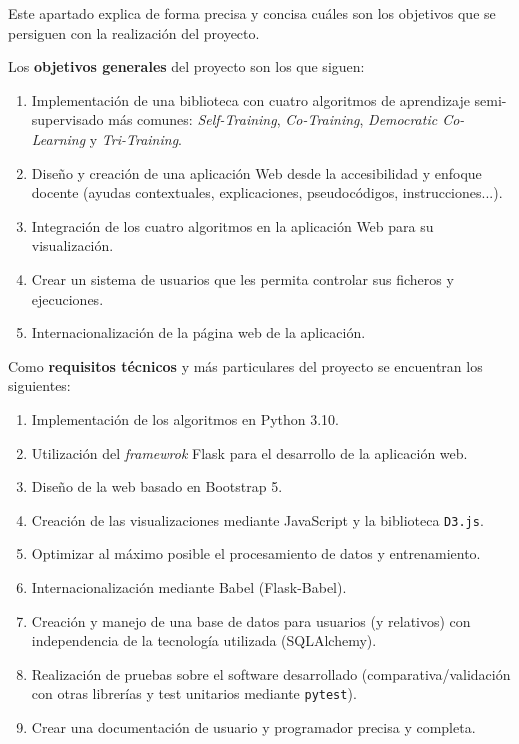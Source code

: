 
Este apartado explica de forma precisa y concisa cuáles son los objetivos que se
persiguen con la realización del proyecto.


Los \textbf{objetivos generales} del proyecto son los que siguen:
\begin{enumerate}
    \item Implementación de una biblioteca con cuatro algoritmos de aprendizaje
    semi-supervisado más comunes: \emph{Self-Training}, \emph{Co-Training},
    \emph{Democratic Co-Learning} y \emph{Tri-Training}.
    \item Diseño y creación de una aplicación Web desde la accesibilidad y
    enfoque docente (ayudas contextuales, explicaciones, pseudocódigos,
    instrucciones...).
    \item Integración de los cuatro algoritmos en la aplicación Web para su
    visualización.
    \item Crear un sistema de usuarios que les permita controlar sus ficheros y ejecuciones.
    \item Internacionalización de la página web de la aplicación.
\end{enumerate}

Como \textbf{requisitos técnicos} y más particulares del proyecto se encuentran
los siguientes:

\begin{enumerate}
    \item Implementación de los algoritmos en Python 3.10.
    \item Utilización del \emph{framewrok} Flask para el desarrollo de la
    aplicación web.
    \item Diseño de la web basado en Bootstrap 5.
    \item Creación de las visualizaciones mediante JavaScript y la biblioteca
    \texttt{D3.js}.
    \item Optimizar al máximo posible el procesamiento de datos y entrenamiento.
    \item Internacionalización mediante Babel (Flask-Babel).
    \item Creación y manejo de una base de datos para usuarios (y relativos) con
    independencia de la tecnología utilizada (SQLAlchemy).
    \item Realización de pruebas sobre el software desarrollado
    (comparativa/validación con otras librerías y test unitarios mediante
    \texttt{pytest}).
    \item Crear una documentación de usuario y programador precisa y completa.
\end{enumerate}